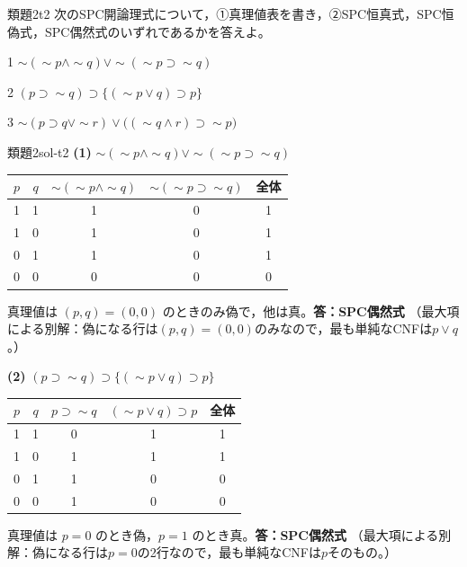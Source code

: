 \documentclass[autodetect-engine,dvi=dvipdfmx,ja=standard]{bxjsarticle}
\begin{document}
\begin{exercise}{類題2}{t2}
次のSPC開論理式について，①真理値表を書き，②SPC恒真式，SPC恒偽式，SPC偶然式のいずれであるかを答えよ。
\begin{pstep}{1}
  \(\sim(\sim p\land\sim q)\lor\sim(\sim p\supset\sim q)\)
\end{pstep}
\begin{pstep}{2}
  \((p\supset\sim q)\supset\bigl\{(\sim p\lor q)\supset p\bigr\}\)
\end{pstep}
\begin{pstep}{3}
  \(\sim(p\supset q\lor\sim r)\lor\bigl((\sim q\land r)\supset\sim p\bigr)\)
\end{pstep}
\end{exercise}

\begin{solution}{類題2}{sol-t2}
\textbf{(1)} \(\sim(\sim p\land\sim q)\lor\sim(\sim p\supset\sim q)\)

\begin{center}
\begin{tabular}{cc|cc|c}
\toprule
\(p\) & \(q\) & \(\sim(\sim p\land\sim q)\) & \(\sim(\sim p\supset\sim q)\) & 全体 \\
\midrule
1 & 1 & 1 & 0 & 1 \\
1 & 0 & 1 & 0 & 1 \\
0 & 1 & 1 & 0 & 1 \\
0 & 0 & 0 & 0 & 0 \\
\bottomrule
\end{tabular}
\end{center}
真理値は \((p,q)=(0,0)\) のときのみ偽で，他は真。\textbf{答：SPC偶然式}
（最大項による別解：偽になる行は\((p,q)=(0,0)\)のみなので，最も単純なCNFは\(p\lor q\)。）

\textbf{(2)} \((p\supset\sim q)\supset\bigl\{(\sim p\lor q)\supset p\bigr\}\)

\begin{center}
\begin{tabular}{cc|c|c|c}
\toprule
\(p\) & \(q\) & \(p\supset\sim q\) & \((\sim p\lor q)\supset p\) & 全体 \\
\midrule
1 & 1 & 0 & 1 & 1 \\
1 & 0 & 1 & 1 & 1 \\
0 & 1 & 1 & 0 & 0 \\
0 & 0 & 1 & 0 & 0 \\
\bottomrule
\end{tabular}
\end{center}
真理値は \(p=0\) のとき偽，\(p=1\) のとき真。\textbf{答：SPC偶然式}
（最大項による別解：偽になる行は\(p=0\)の2行なので，最も単純なCNFは\(p\)そのもの。）


\end{solution}
\end{document}
